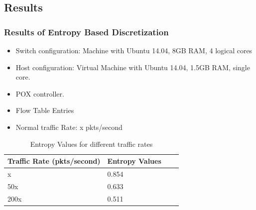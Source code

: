 \documentclass[10pt]{beamer}
\begin{document}
\begin{frame}
\section[]{Results}
\frametitle{Results of Entropy Based Discretization}
\begin{itemize}
\footnotesize
\item
Switch configuration: Machine with Ubuntu 14.04, 8GB RAM, 4 logical cores
\item
Host configuration: Virtual Machine with Ubuntu 14.04, 1.5GB RAM, single core. 
\item 
POX controller.
\item
Flow Table Entries
\item
Normal traffic Rate: x pkts/second
\end{itemize}

\begin{table}
\scriptsize
\begin{center}
\begin{tabular}{ | m{2cm} | m{2cm}| m{2cm} | m{2cm} |} 
\hline
\textbf{Traffic Rate (pkts/second)} & \textbf{Entropy Values} \\
\hline
x &
0.854 \\
\hline
50x &
0.633 \\
\hline
200x &
0.511 \\
\hline
\end{tabular}
\end{center}
\caption{\footnotesize Entropy Values for different traffic rates}
\end{table}
\end{frame}
\end{document}
